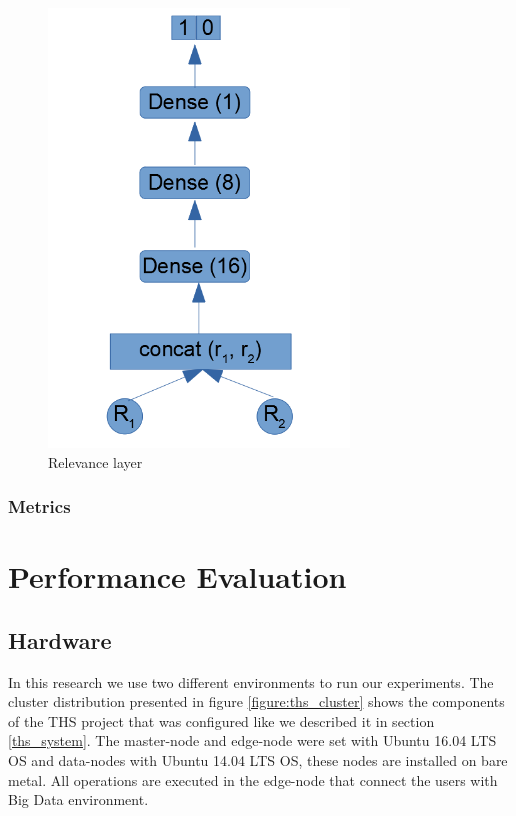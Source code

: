 \documentclass[12pt]{report}
\begin{document}
\begin{figure}[H]	
	\centering
	\includegraphics[width=80mm, scale = 1]{images/15_classification.png}	
	\caption{Relevance layer}	
	\label{figure:classification}
\end{figure}

\subsection{Metrics}

\chapter{Performance Evaluation} \label{chapter 5}
\section{Hardware} 

In this research we use two different environments to run our experiments. The cluster distribution presented in figure \ref{figure:ths_cluster} shows the components of the \ac{THS} project that was configured like we described it in section \ref{ths_system}. The master-node and edge-node were set with Ubuntu 16.04 LTS \ac{OS} and data-nodes with Ubuntu 14.04 LTS \ac{OS}, these nodes are installed on bare metal. All operations are executed in the edge-node that connect the users with Big Data environment.
\end{document}
